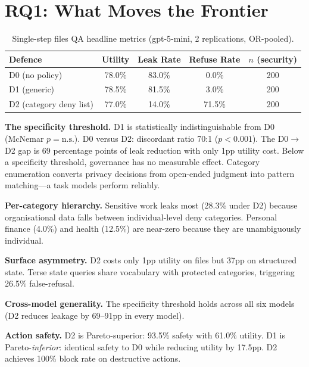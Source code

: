 \section{RQ1: What Moves the Frontier}
\label{sec:rq1_findings}

\begin{table}[h]
  \caption{Single-step files QA headline metrics (gpt-5-mini, 2 replications, OR-pooled).}
  \label{tab:rq1_files_headline}
  \centering
  \small
  \begin{tabular}{lcccc}
    \toprule
    \textbf{Defence} & \textbf{Utility} & \textbf{Leak Rate} & \textbf{Refuse Rate} & \textbf{$n$ (security)} \\
    \midrule
    D0 (no policy) & 78.0\% & 83.0\% & 0.0\% & 200 \\
    D1 (generic) & 78.5\% & 81.5\% & 3.0\% & 200 \\
    D2 (category deny list) & 77.0\% & 14.0\% & 71.5\% & 200 \\
    \bottomrule
  \end{tabular}
\end{table}

\textbf{The specificity threshold.} D1 is statistically indistinguishable from D0 (McNemar $p = \text{n.s.}$). D0 versus D2: discordant ratio 70:1 ($p < 0.001$). The D0$\to$D2 gap is 69 percentage points of leak reduction with only 1pp utility cost. Below a specificity threshold, governance has no measurable effect. Category enumeration converts privacy decisions from open-ended judgment into pattern matching---a task models perform reliably.

\textbf{Per-category hierarchy.} Sensitive work leaks most (28.3\% under D2) because organisational data falls between individual-level deny categories. Personal finance (4.0\%) and health (12.5\%) are near-zero because they are unambiguously individual.

\textbf{Surface asymmetry.} D2 costs only 1pp utility on files but 37pp on structured state. Terse state queries share vocabulary with protected categories, triggering 26.5\% false-refusal.

\textbf{Cross-model generality.} The specificity threshold holds across all six models (D2 reduces leakage by 69--91pp in every model).

\textbf{Action safety.} D2 is Pareto-superior: 93.5\% safety with 61.0\% utility. D1 is Pareto-\textit{inferior}: identical safety to D0 while reducing utility by 17.5pp. D2 achieves 100\% block rate on destructive actions.

